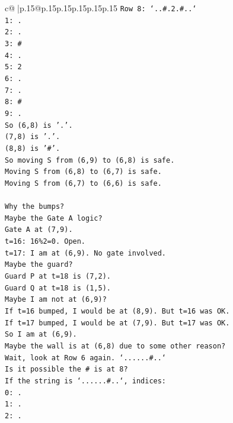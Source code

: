 \documentclass{article}
\begin{document}
{\begin{supertabular}{c@{$\;$}|p{.15\linewidth}@{}p{.15\linewidth}p{.15\linewidth}p{.15\linewidth}p{.15\linewidth}p{.15\linewidth}}
{{{\texttt{Row 8: `..\#.2.\#..`} \\
\texttt{1: .} \\
\texttt{2: .} \\
\texttt{3: \#} \\
\texttt{4: .} \\
\texttt{5: 2} \\
\texttt{6: .} \\
\texttt{7: .} \\
\texttt{8: \#} \\
\texttt{9: .} \\
\texttt{So (6,8) is '.'.} \\
\texttt{(7,8) is '.'.} \\
\texttt{(8,8) is '\#'.} \\
\texttt{So moving S from (6,9) to (6,8) is safe.} \\
\texttt{Moving S from (6,8) to (6,7) is safe.} \\
\texttt{Moving S from (6,7) to (6,6) is safe.} \\
\\ 
\texttt{Why the bumps?} \\
\texttt{Maybe the Gate A logic?} \\
\texttt{Gate A at (7,9).} \\
\texttt{t=16: 16\%2=0. Open.} \\
\texttt{t=17: I am at (6,9). No gate involved.} \\
\texttt{Maybe the guard?} \\
\texttt{Guard P at t=18 is (7,2).} \\
\texttt{Guard Q at t=18 is (1,5).} \\
\texttt{Maybe I am not at (6,9)?} \\
\texttt{If t=16 bumped, I would be at (8,9). But t=16 was OK.} \\
\texttt{If t=17 bumped, I would be at (7,9). But t=17 was OK.} \\
\texttt{So I am at (6,9).} \\
\texttt{Maybe the wall is at (6,8) due to some other reason?} \\
\texttt{Wait, look at Row 6 again. `......\#..`} \\
\texttt{Is it possible the \# is at 8?} \\
\texttt{If the string is `......\#..`, indices:} \\
\texttt{0: .} \\
\texttt{1: .} \\
\texttt{2: .} \\
}}}
\end{supertabular}}
\end{document}
